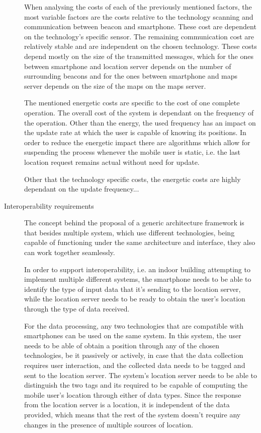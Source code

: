 \begin{description}
When analysing the costs of each of the previously mentioned factors, the most variable factors are the costs relative to the technology scanning and communication between beacon and smartphone. These cost are dependent on the technology's specific sensor. The remaining communication cost are relatively stable and are independent on the chosen technology. These costs depend mostly on the size of the transmitted messages, which for the ones between smartphone and location server depends on the number of surrounding beacons and for the ones between smartphone and maps server depends on the size of the maps on the maps server.  

The mentioned energetic costs are specific to the cost of one complete operation. The overall cost of the system is dependant on the frequency of the operation. Other than the energy, the used frequency has an impact on the update rate at which the user is capable of knowing its positions. In order to reduce the energetic impact there are algorithms which allow for suspending the process whenever the mobile user is static, i.e. the last location request remains actual without need for update.

Other that the technology specific costs, the energetic costs are highly dependant on the update frequency... 


\item [Interoperability requirements] The concept behind the proposal of a generic architecture framework is that besides multiple system, which use different technologies, being capable of functioning under the same architecture and interface, they also can work together seamlessly. 

In order to support interoperability, i.e. an indoor building attempting to implement multiple different systems, the smartphone needs to be able to identify the type of input data that it's sending to the location server, while the location server needs to be ready to obtain the user's location through the type of data received.

For the data processing, any two technologies that are compatible with smartphones can be used on the same system. In this system, the user needs to be able of obtain a position through any of the chosen technologies, be it passively or actively, in case that the data collection requires user interaction, and the collected data needs to be tagged and sent to the location server. The system's location server needs to be able to distinguish the two tags and its required to be capable of computing the mobile user's location through either of data types. Since the response from the location server is a location, it is independent of the data provided, which means that the rest of the system doesn't require any changes in the presence of multiple sources of location.


\end{description}
